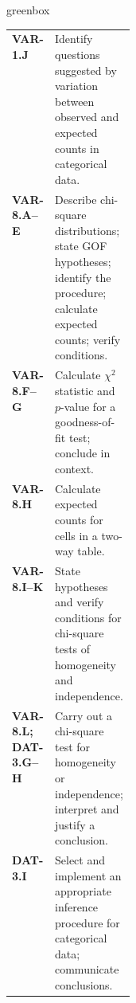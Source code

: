\documentclass[10pt]{article}
\begin{document}
\begin{skillbox}{greenbox}
\small
\begin{tabularx}{\linewidth}{@{} >{\bfseries}p{0.18\linewidth} X @{}}
  VAR-1.J       & Identify questions suggested by variation between observed and expected counts in categorical data. \\
  VAR-8.A--E    & Describe chi-square distributions; state GOF hypotheses; identify the procedure; calculate expected counts; verify conditions. \\
  VAR-8.F--G    & Calculate $\chi^2$ statistic and $p$-value for a goodness-of-fit test; conclude in context. \\
  VAR-8.H       & Calculate expected counts for cells in a two-way table. \\
  VAR-8.I--K    & State hypotheses and verify conditions for chi-square tests of homogeneity and independence. \\
  VAR-8.L; DAT-3.G--H & Carry out a chi-square test for homogeneity or independence; interpret and justify a conclusion. \\
  DAT-3.I       & Select and implement an appropriate inference procedure for categorical data; communicate conclusions. \\
\end{tabularx}
\end{skillbox}
\end{document}
